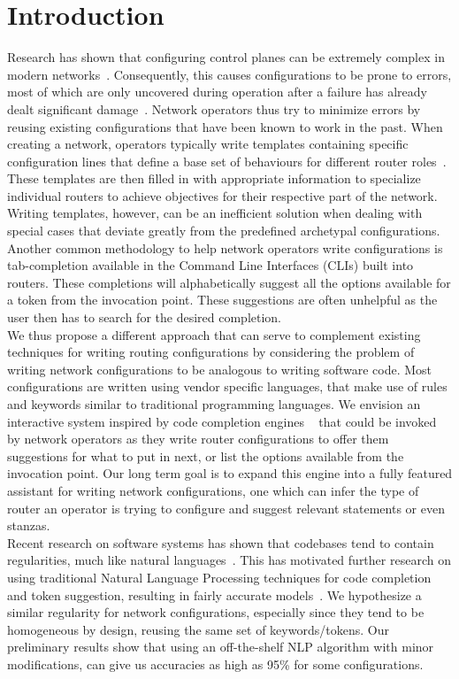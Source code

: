 \section{Introduction}

Research has shown that configuring control planes can be extremely complex in modern networks~\cite{complexity}. Consequently, this causes configurations to be prone to errors, most of which are only uncovered during operation after a failure has already dealt significant damage~\cite{errors}. Network operators thus try to minimize errors by reusing existing configurations that have been known to work in the past. When creating a network, operators typically write templates containing specific configuration lines that define a base set of behaviours for different router roles~\cite{complexity}. These templates are then filled in with appropriate information to specialize individual routers to achieve objectives for their respective part of the network. Writing templates, however, can be an inefficient solution when dealing with special cases that deviate greatly from the predefined archetypal configurations.\\

Another common methodology to help network operators write configurations is tab-completion available in the Command Line Interfaces (CLIs) built into routers. These completions will alphabetically suggest all the options available for a token from the invocation point. These suggestions are often unhelpful as the user then has to search for the desired completion.\\

We thus propose a different approach that can serve to complement existing techniques for writing routing configurations by considering the problem of writing network configurations to be analogous to writing software code. Most configurations are written using vendor specific languages, that make use of rules and keywords similar to traditional programming languages. We envision an interactive system inspired by code completion engines ~\cite{raychev, intelliJ-completion} that could be invoked by network operators as they write router configurations to offer them suggestions for what to put in next, or list the options available from the invocation point. Our long term goal is to expand this engine into a fully featured assistant for writing network configurations, one which can infer the type of router an operator is trying to configure and suggest relevant statements or even stanzas.\\

Recent research on software systems has shown that codebases tend to contain regularities, much like natural languages~\cite{naturalness}. This has motivated further research on using traditional Natural Language Processing techniques for code completion and token suggestion, resulting in fairly accurate models~\cite{naturalness, raychev}. We hypothesize a similar regularity for network configurations, especially since they tend to be homogeneous by design, reusing the same set of keywords/tokens. Our preliminary results show that using an off-the-shelf NLP algorithm with minor modifications, can give us accuracies as high as 95\% for some configurations.\\

